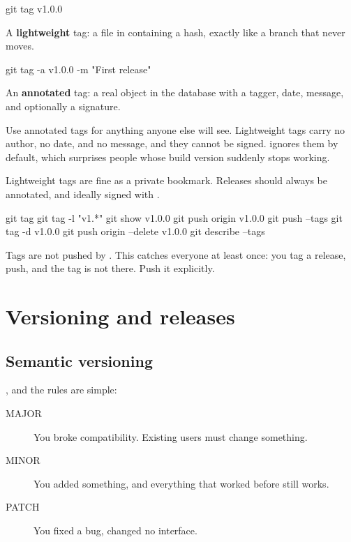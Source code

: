 \documentclass[11pt]{article}
\begin{document}
\begin{shell}
git tag v1.0.0
\end{shell}

A \textbf{lightweight} tag: a file in  containing a hash, exactly like
a branch that never moves.

\begin{shell}
git tag -a v1.0.0 -m "First release"
\end{shell}

An \textbf{annotated} tag: a real object in the database with a tagger, date,
message, and optionally a signature.

\begin{trap}
Use annotated tags for anything anyone else will see. Lightweight tags carry no
author, no date, and no message, and they cannot be signed. 
ignores them by default, which surprises people whose build version suddenly stops
working.

Lightweight tags are fine as a private bookmark. Releases should always be
annotated, and ideally signed with .
\end{trap}

\begin{shell}
git tag
git tag -l "v1.*"
git show v1.0.0
git push origin v1.0.0
git push --tags
git tag -d v1.0.0
git push origin --delete v1.0.0
git describe --tags
\end{shell}

\begin{note}
Tags are not pushed by . This catches everyone at least once: you tag a
release, push, and the tag is not there. Push it explicitly.
\end{note}

\section{Versioning and releases}

\subsection{Semantic versioning}

, and the rules are simple:

\begin{description}
  \item[MAJOR] You broke compatibility. Existing users must change something.
  \item[MINOR] You added something, and everything that worked before still works.
  \item[PATCH] You fixed a bug, changed no interface.
\end{description}
\end{document}
